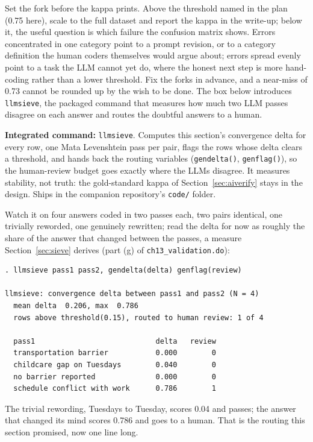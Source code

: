 \documentclass[
    a4paper,
    fontsize=10pt,
    twoside=true,
    numbers=noenddot,
]{kaobook}
\begin{document}
Set the fork before the kappa prints. Above the threshold named in the plan (0.75 here), scale to the full dataset and report the kappa in the write-up; below it, the useful question is which failure the confusion matrix shows. Errors concentrated in one category point to a prompt revision, or to a category definition the human coders themselves would argue about; errors spread evenly point to a task the LLM cannot yet do, where the honest next step is more hand-coding rather than a lower threshold. Fix the forks in advance, and a near-miss of 0.73 cannot be rounded up by the wish to be done. The box below introduces \texttt{llmsieve}, the packaged command that measures how much two LLM passes disagree on each answer and routes the doubtful answers to a human.

\begin{kaobox}[frametitle=Package Integration: \texttt{llmsieve}]
\textbf{Integrated command:} \texttt{llmsieve}. Computes this section's convergence delta for every row, one Mata Levenshtein pass per pair, flags the rows whose delta clears a threshold, and hands back the routing variables (\texttt{gendelta()}, \texttt{genflag()}), so the human-review budget goes exactly where the LLMs disagree. It measures stability, not truth: the gold-standard kappa of Section~\ref{sec:aiverify} stays in the design. Ships in the companion repository's \texttt{code/} folder.
\end{kaobox}

Watch it on four answers coded in two passes each, two pairs identical, one trivially reworded, one genuinely rewritten; read the delta for now as roughly the share of the answer that changed between the passes, a measure Section~\ref{sec:sieve} derives (part (g) of \texttt{ch13\_validation.do}):
\par
{\footnotesize
\begin{verbatim}
. llmsieve pass1 pass2, gendelta(delta) genflag(review)

llmsieve: convergence delta between pass1 and pass2 (N = 4)
  mean delta  0.206, max  0.786
  rows above threshold(0.15), routed to human review: 1 of 4

  pass1                            delta   review
  transportation barrier           0.000        0
  childcare gap on Tuesdays        0.040        0
  no barrier reported              0.000        0
  schedule conflict with work      0.786        1
\end{verbatim}
}
The trivial rewording, Tuesdays to Tuesday, scores 0.04 and passes; the answer that changed its mind scores 0.786 and goes to a human. That is the routing this section promised, now one line long.
\end{document}
